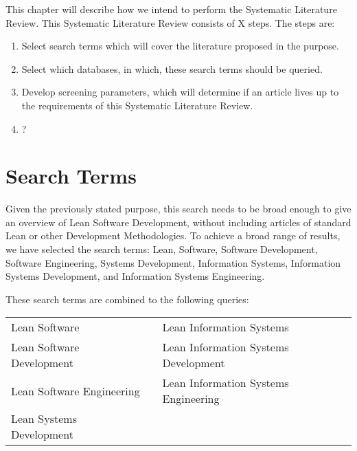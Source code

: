 This chapter will describe how we intend to perform the Systematic Literature Review.
This Systematic Literature Review consists of X steps. The steps are:
\begin{enumerate}
	\item Select search terms which will cover the literature proposed in the purpose.
	\item Select which databases, in which, these search terms should be queried.
	\item Develop screening parameters, which will determine if an article lives up to the requirements of this Systematic Literature Review.
	\item ?
\end{enumerate} 

\section{Search Terms}
Given the previously stated purpose, this search needs to be broad enough to give an overview of Lean Software Development, without including articles of standard Lean or other Development Methodologies.  
To achieve a broad range of results, we have selected the search terms: 
Lean, 
Software, 
Software Development, 
Software Engineering, 
Systems Development, 
Information Systems, 
Information Systems Development, 
and Information Systems Engineering.

These search terms are combined to the following queries:
\begin{table}[H]
	\centering
	\begin{tabular}{ l c l }
		\tabitem Lean Software  & \hspace{1cm} & \tabitem Lean Information Systems \\ 
		\tabitem Lean Software Development & \hspace{1cm} & \tabitem Lean Information Systems Development\\ 
		\tabitem Lean Software Engineering & \hspace{1cm} & \tabitem Lean Information Systems Engineering\\ 
		\tabitem Lean Systems Development & \hspace{1cm} & \\  
	\end{tabular}
\end{table} 

